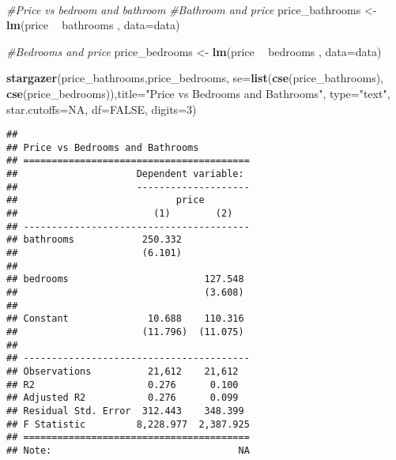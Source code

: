 \documentclass[
]{article}
\newenvironment{Shaded}{\begin{snugshade}}{\end{snugshade}}
\newcommand{\CommentTok}[1]{\textcolor[rgb]{0.56,0.35,0.01}{\textit{#1}}}
\newcommand{\DataTypeTok}[1]{\textcolor[rgb]{0.13,0.29,0.53}{#1}}
\newcommand{\DecValTok}[1]{\textcolor[rgb]{0.00,0.00,0.81}{#1}}
\newcommand{\KeywordTok}[1]{\textcolor[rgb]{0.13,0.29,0.53}{\textbf{#1}}}
\newcommand{\NormalTok}[1]{#1}
\newcommand{\OperatorTok}[1]{\textcolor[rgb]{0.81,0.36,0.00}{\textbf{#1}}}
\newcommand{\OtherTok}[1]{\textcolor[rgb]{0.56,0.35,0.01}{#1}}
\newcommand{\StringTok}[1]{\textcolor[rgb]{0.31,0.60,0.02}{#1}}
\begin{document}
~

\begin{Shaded}
\begin{Highlighting}[]
\CommentTok{#Price vs bedroom and bathroom}
\CommentTok{#Bathroom and price}
\NormalTok{price_bathrooms <-}\StringTok{  }\KeywordTok{lm}\NormalTok{(price }\OperatorTok{~}\StringTok{ }\NormalTok{bathrooms , }\DataTypeTok{data=}\NormalTok{data)}

\CommentTok{#Bedrooms and price}
\NormalTok{price_bedrooms <-}\StringTok{  }\KeywordTok{lm}\NormalTok{(price }\OperatorTok{~}\StringTok{ }\NormalTok{bedrooms , }\DataTypeTok{data=}\NormalTok{data)}

\KeywordTok{stargazer}\NormalTok{(price_bathrooms,price_bedrooms, }\DataTypeTok{se=}\KeywordTok{list}\NormalTok{(}\KeywordTok{cse}\NormalTok{(price_bathrooms), }\KeywordTok{cse}\NormalTok{(price_bedrooms)),}\DataTypeTok{title=}\StringTok{"Price vs Bedrooms and Bathrooms"}\NormalTok{, }\DataTypeTok{type=}\StringTok{"text"}\NormalTok{, }\DataTypeTok{star.cutoffs=}\OtherTok{NA}\NormalTok{, }\DataTypeTok{df=}\OtherTok{FALSE}\NormalTok{, }\DataTypeTok{digits=}\DecValTok{3}\NormalTok{)}
\end{Highlighting}
\end{Shaded}

\begin{verbatim}
## 
## Price vs Bedrooms and Bathrooms
## ========================================
##                     Dependent variable: 
##                     --------------------
##                            price        
##                        (1)        (2)   
## ----------------------------------------
## bathrooms            250.332            
##                      (6.101)            
##                                         
## bedrooms                        127.548 
##                                 (3.608) 
##                                         
## Constant              10.688    110.316 
##                      (11.796)  (11.075) 
##                                         
## ----------------------------------------
## Observations          21,612    21,612  
## R2                    0.276      0.100  
## Adjusted R2           0.276      0.099  
## Residual Std. Error  312.443    348.399 
## F Statistic         8,228.977  2,387.925
## ========================================
## Note:                                 NA
\end{verbatim}

~
\end{document}
